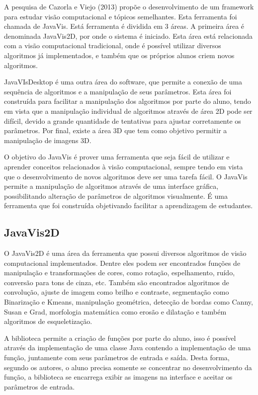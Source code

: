 \documentclass[
	12pt,				%
	oneside,			%
	a4paper,			%
	english,			%
	french,				%
	spanish,			%
	brazil,				%
	]{abntex2}
\begin{document}
A pesquisa de Cazorla e Viejo (2013) propõe o desenvolvimento de um framework para estudar visão computacional e tópicos semelhantes. Esta ferramenta foi chamada de JavaVis. Está ferramenta é dividida em 3 áreas. A primeira área é denominada JavaVis2D, por onde o sistema é iniciado. Esta área está relacionada com a visão computacional tradicional, onde é possível utilizar diversos algoritmos já implementados, e também que os próprios alunos criem novos algoritmos. 

JavaVIsDesktop é uma outra área do software, que permite a conexão de uma sequência de algoritmos e a manipulação de seus parâmetros. Esta área foi construída para facilitar a manipulação dos algoritmos por parte do aluno, tendo em vista que a manipulação individual de algoritmos através de área 2D pode ser difícil, devido a grande quantidade de tentativas para ajustar corretamente os parâmetros. Por final, existe a área 3D que tem como objetivo permitir a manipulação de imagens 3D.

O objetivo do JavaVis é prover uma ferramenta que seja fácil de utilizar e aprender conceitos relacionados à visão computacional, sempre tendo em vista que o desenvolvimento de novos algoritmos deve ser uma tarefa fácil. O JavaVis permite a manipulação de algoritmos através de uma interface gráfica, possibilitando alteração de parâmetros de algoritmos visualmente. É uma ferramenta que foi construída objetivando facilitar a aprendizagem de estudantes.

\subsection{JavaVis2D}

O JavaVis2D é uma área da ferramenta que possui diversos algoritmos de visão computacional implementados. Dentre eles podem ser encontrados funções de manipulação e transformações de cores, como rotação, espelhamento, ruído, conversão para tons de cinza, etc. Também são encontrados algoritmos de convolução, ajuste de imagem como brilho e contraste, segmentação como Binarização e Kmeans, manipulação geométrica, detecção de bordas como Canny, Susan e Grad, morfologia matemática como erosão e dilatação e também algoritmos de esqueletização. 

A biblioteca permite a criação de funções por parte do aluno, isso é possível através da implementação de uma classe Java contendo a implementação de uma função, juntamente com seus parâmetros de entrada e saída. Desta forma, segundo os autores, o aluno precisa somente se concentrar no desenvolvimento da função, a biblioteca se encarrega exibir as imagens na interface e aceitar os parâmetros de entrada.
\end{document}
